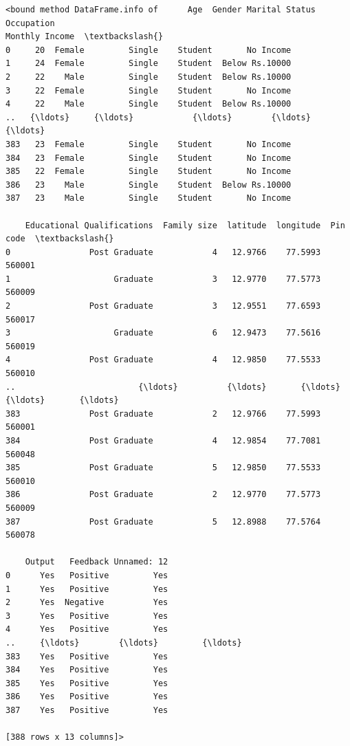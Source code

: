 \documentclass[11pt]{article}
\makeatletter
\newcommand{\boxspacing}{\kern\kvtcb@left@rule\kern\kvtcb@boxsep}
\newcommand{\prompt}[4]{
        {\ttfamily\llap{{\color{#2}[#3]:\hspace{3pt}#4}}\vspace{-\baselineskip}}
    }
\makeatother
\begin{document}
            \begin{tcolorbox}[breakable, size=fbox, boxrule=.5pt, pad at break*=1mm, opacityfill=0]
\prompt{Out}{outcolor}{11}{\boxspacing}
\begin{Verbatim}[commandchars=\\\{\}]
<bound method DataFrame.info of      Age  Gender Marital Status Occupation
Monthly Income  \textbackslash{}
0     20  Female         Single    Student       No Income
1     24  Female         Single    Student  Below Rs.10000
2     22    Male         Single    Student  Below Rs.10000
3     22  Female         Single    Student       No Income
4     22    Male         Single    Student  Below Rs.10000
..   {\ldots}     {\ldots}            {\ldots}        {\ldots}             {\ldots}
383   23  Female         Single    Student       No Income
384   23  Female         Single    Student       No Income
385   22  Female         Single    Student       No Income
386   23    Male         Single    Student  Below Rs.10000
387   23    Male         Single    Student       No Income

    Educational Qualifications  Family size  latitude  longitude  Pin code  \textbackslash{}
0                Post Graduate            4   12.9766    77.5993    560001
1                     Graduate            3   12.9770    77.5773    560009
2                Post Graduate            3   12.9551    77.6593    560017
3                     Graduate            6   12.9473    77.5616    560019
4                Post Graduate            4   12.9850    77.5533    560010
..                         {\ldots}          {\ldots}       {\ldots}        {\ldots}       {\ldots}
383              Post Graduate            2   12.9766    77.5993    560001
384              Post Graduate            4   12.9854    77.7081    560048
385              Post Graduate            5   12.9850    77.5533    560010
386              Post Graduate            2   12.9770    77.5773    560009
387              Post Graduate            5   12.8988    77.5764    560078

    Output   Feedback Unnamed: 12
0      Yes   Positive         Yes
1      Yes   Positive         Yes
2      Yes  Negative          Yes
3      Yes   Positive         Yes
4      Yes   Positive         Yes
..     {\ldots}        {\ldots}         {\ldots}
383    Yes   Positive         Yes
384    Yes   Positive         Yes
385    Yes   Positive         Yes
386    Yes   Positive         Yes
387    Yes   Positive         Yes

[388 rows x 13 columns]>
\end{Verbatim}
\end{tcolorbox}
        
\end{document}
